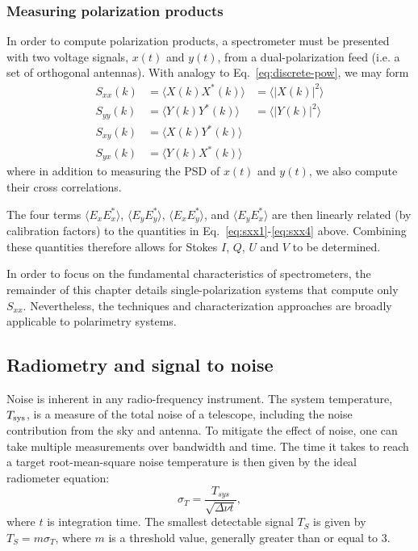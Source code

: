 \documentclass{ws-rv961x669}
\begin{document}
\subsubsection{Measuring polarization products}

In order to compute polarization products, a spectrometer must be presented with two voltage signals, $x(t)$ and $y(t)$, from a dual-polarization feed (i.e. a set of orthogonal antennas). With analogy to Eq.~\ref{eq:discrete-pow}, we may form 
\begin{eqnarray}
S_{xx}(k) & =  \langle X(k)X^*(k)\rangle  & = \langle |X(k)|^2\rangle \label{eq:sxx1} \\
S_{yy}(k) & =  \langle Y(k)Y^*(k)\rangle  & = \langle |Y(k)|^2\rangle \\
S_{xy}(k) & =  \langle X(k)Y^*(k)\rangle  & \\
S_{yx}(k) & =  \langle Y(k)X^*(k)\rangle  & \label{eq:sxx4}
\end{eqnarray}
where in addition to measuring the PSD of $x(t)$ and $y(t)$, we also compute their cross correlations.  

The four terms $\langle E_x E_x^*\rangle$, $\langle E_y E_y^* \rangle$, $\langle E_x E_y^* \rangle$, and $\langle E_y E_x^* \rangle$ are then linearly related (by calibration factors) to the quantities in Eq.~\ref{eq:sxx1}-\ref{eq:sxx4} above. Combining these quantities therefore allows for Stokes $I$, $Q$, $U$ and $V$ to be determined.

In order to focus on the fundamental characteristics of spectrometers, the remainder of this chapter details single-polarization systems that compute only $S_{xx}$. Nevertheless, the techniques and characterization approaches are broadly applicable to polarimetry systems.

\subsection{Radiometry and signal to noise}

Noise is inherent in any radio-frequency instrument. The system temperature, $T_{\rm{sys}}$, is a measure of the total noise of a telescope, including the noise contribution from the sky and antenna. To mitigate the effect of noise, one can take multiple measurements over bandwidth and time. The time it takes to reach a target root-mean-square noise temperature is then given by the ideal radiometer equation: 
\begin{equation}
\sigma_{T}=\frac{T_{sys}}{\sqrt{\Delta\nu t}},\label{eq:radiometer-eqn}
\end{equation}
where $t$ is integration time. The smallest detectable signal $T_{S}$ is given by $T_{S}=m\sigma_T$, where $m$ is a threshold value, generally greater than or equal to 3. 
\end{document}
